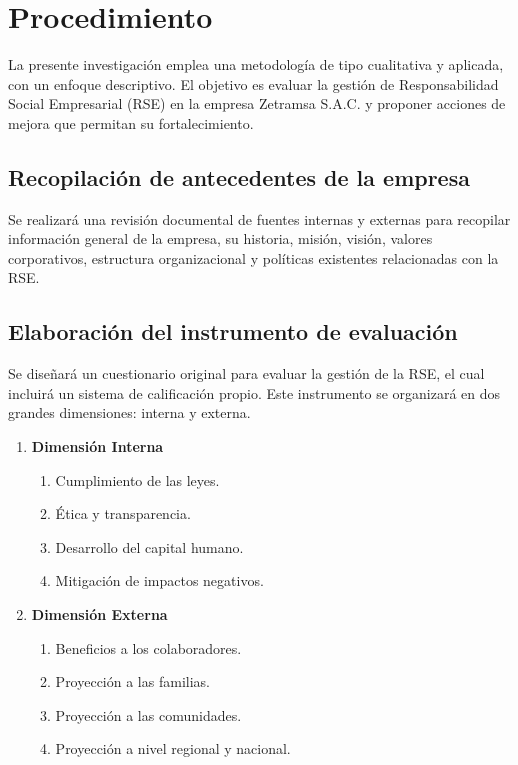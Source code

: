 \documentclass[a4paber,12pt]{article}
\begin{document}
	\section{Procedimiento}
	
	La presente investigación emplea una metodología de tipo cualitativa y aplicada, con un enfoque descriptivo. El objetivo es evaluar la gestión de Responsabilidad Social Empresarial (RSE) en la empresa Zetramsa S.A.C. y proponer acciones de mejora que permitan su fortalecimiento.
	
	\subsection{Recopilación de antecedentes de la empresa}
	Se realizará una revisión documental de fuentes internas y externas para recopilar información general de la empresa, su historia, misión, visión, valores corporativos, estructura organizacional y políticas existentes relacionadas con la RSE.
	
	\subsection{Elaboración del instrumento de evaluación}
	Se diseñará un cuestionario original para evaluar la gestión de la RSE, el cual incluirá un sistema de calificación propio. Este instrumento se organizará en dos grandes dimensiones: interna y externa.
	
	\begin{enumerate}[label=\Alph*.]
		\item \textbf{Dimensión Interna}
		\begin{enumerate}[label=\alph*)]
			\item Cumplimiento de las leyes.
			\item Ética y transparencia.
			\item Desarrollo del capital humano.
			\item Mitigación de impactos negativos.
		\end{enumerate}
		
		\item \textbf{Dimensión Externa}
		\begin{enumerate}[label=\alph*)]
			\item Beneficios a los colaboradores.
			\item Proyección a las familias.
			\item Proyección a las comunidades.
			\item Proyección a nivel regional y nacional.
		\end{enumerate}
	\end{enumerate}
	
\end{document}
